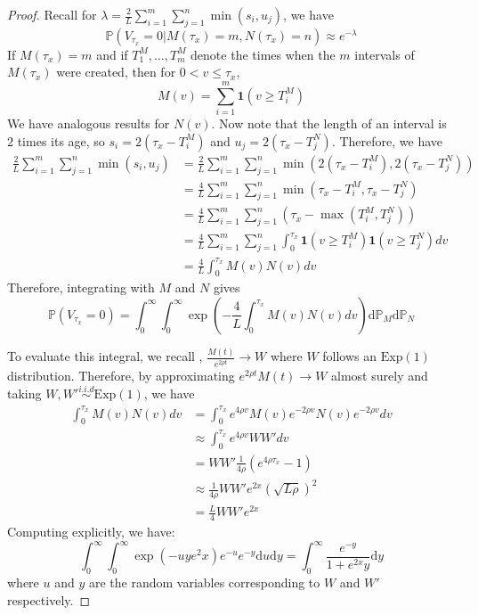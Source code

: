 \documentclass{article}
\begin{document}
\begin{proof}
    Recall for $\lambda=\frac{2}{L}\sum_{i=1}^{m}\sum_{j=1}^{n} \min(s_i, u_j)$, we have
    \begin{equation*}
        \mathbb{P}(V_{\tau_x} = 0 | M(\tau_x) = m, N(\tau_x) = n) \approx e^{-\lambda}
    \end{equation*}
    If $M(\tau_x)=m$ and if $T_1^M, \ldots, T_m^M$ denote the times when the $m$ intervals of $M(\tau_x)$ were created, then for $0<v\leq \tau_x$,
    \begin{equation*}
        M(v) = \sum_{i=1}^m \mathbf{1}(v\geq T_i^M)
    \end{equation*}
    We have analogous results for $N(v)$. Now note that the length of an interval is $2$ times its age, so $s_i = 2 (\tau_x - T_i^M)$ and $u_j = 2 (\tau_x - T_j^N)$. Therefore, we have
    \begin{align*}
        \frac{2}{L} \sum_{i=1}^m \sum_{j=1}^n \min(s_i, u_j) &= \frac{2}{L} \sum_{i=1}^m \sum_{j=1}^n \min(2(\tau_x - T_i^M), 2(\tau_x - T_j^N)) \\
        &= \frac{4}{L} \sum_{i=1}^m \sum_{j=1}^n \min(\tau_x - T_i^M, \tau_x - T_j^N) \\
        &= \frac{4}{L} \sum_{i=1}^m \sum_{j=1}^n (\tau_x - \max(T_i^M, T_j^N)) \\
        &= \frac{4}{L} \sum_{i=1}^m \sum_{j=1}^n \int_0^{\tau_x} \mathbf{1}(v \geq T_i^M) \mathbf{1}(v \geq T_j^N) dv \\
        &= \frac{4}{L} \int_0^{\tau_x} M(v) N(v) dv
    \end{align*}  
    Therefore, integrating with $M$ and $N$ gives
    \begin{equation*}
        \mathbb{P}(V_{\tau_x} = 0) = \int_0^{\infty} \int_0^{\infty}\exp\left(-\frac{4}{L} \int_0^{\tau_x} M(v) N(v) dv\right) \mathrm{d}\mathbb{P}_M \mathrm{d}\mathbb{P}_N
    \end{equation*}

    To evaluate this integral, we recall , $\frac{M(t)}{e^{2\rho t}} \to W$ where $W$ follows an $\mathrm{Exp}(1)$ distribution. Therefore, by approximating $e^{2\rho t} M(t) \to W$ almost surely and taking $W, W' \overset{i.i.d}{\sim} \mathrm{Exp}(1)$, we have  
    \begin{align*}
        \int_0^{\tau_x} M(v)N(v) dv &= \int_0^{\tau_x} e^{4\rho v} M(v)e^{-2\rho v} N(v)e^{-2\rho v} dv \\
        &\approx \int_0^{\tau_x} e^{4\rho v} W W' dv \\
        &= WW'\frac{1}{4\rho} (e^{4\rho \tau_x} - 1) \\
        &\approx \frac{1}{4\rho} WW' e^{2x} (\sqrt{L \rho})^2 \\
        &= \frac{L}{4} WW' e^{2x}
    \end{align*}
    Computing explicitly, we have:
\begin{equation*}
    \int_0^{\infty} \int_0^{\infty} \exp(-uy e^2x) e^{-u} e^{-y} \mathrm{d}u \mathrm{d}y = \int_0^{\infty} \frac{e^{-y}}{1+e^{2x}y} \mathrm{d}y
\end{equation*}
where $u$ and $y$ are the random variables corresponding to $W$ and $W'$ respectively.  
\end{proof}
\end{document}
